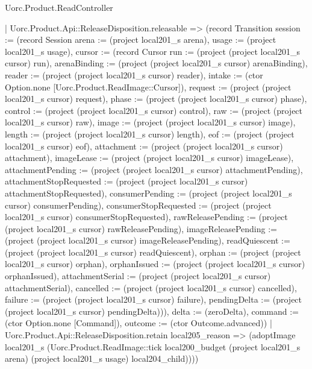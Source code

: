 \begin{lexlean}{Uorc.Product.ReadController}
\begin{semanticmodule}
{          | Uorc.Product.Api::ReleaseDisposition.releasable => (record Transition {session := (record Session {arena := (project local201_s arena), usage := (project local201_s usage), cursor := (record Cursor {run := (project (project local201_s cursor) run), arenaBinding := (project (project local201_s cursor) arenaBinding), reader := (project (project local201_s cursor) reader), intake := (ctor Option.none [Uorc.Product.ReadImage::Cursor]), request := (project (project local201_s cursor) request), phase := (project (project local201_s cursor) phase), control := (project (project local201_s cursor) control), raw := (project (project local201_s cursor) raw), image := (project (project local201_s cursor) image), length := (project (project local201_s cursor) length), eof := (project (project local201_s cursor) eof), attachment := (project (project local201_s cursor) attachment), imageLease := (project (project local201_s cursor) imageLease), attachmentPending := (project (project local201_s cursor) attachmentPending), attachmentStopRequested := (project (project local201_s cursor) attachmentStopRequested), consumerPending := (project (project local201_s cursor) consumerPending), consumerStopRequested := (project (project local201_s cursor) consumerStopRequested), rawReleasePending := (project (project local201_s cursor) rawReleasePending), imageReleasePending := (project (project local201_s cursor) imageReleasePending), readQuiescent := (project (project local201_s cursor) readQuiescent), orphan := (project (project local201_s cursor) orphan), orphanIssued := (project (project local201_s cursor) orphanIssued), attachmentSerial := (project (project local201_s cursor) attachmentSerial), cancelled := (project (project local201_s cursor) cancelled), failure := (project (project local201_s cursor) failure), pendingDelta := (project (project local201_s cursor) pendingDelta)})}), delta := (zeroDelta), command := (ctor Option.none [Command]), outcome := (ctor Outcome.advanced)})
          | Uorc.Product.Api::ReleaseDisposition.retain local205_reason => (adoptImage local201_s (Uorc.Product.ReadImage::tick local200_budget (project local201_s arena) (project local201_s usage) local204_child))))
}
\end{semanticmodule}
\end{lexlean}
